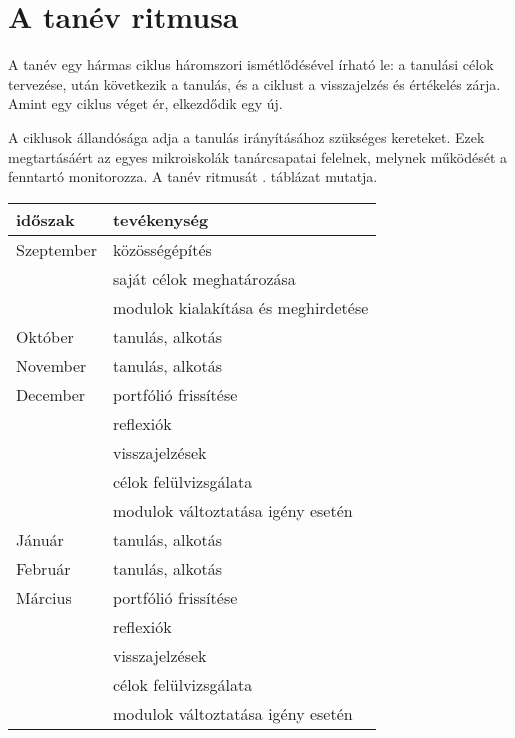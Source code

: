 \section{A tanév ritmusa}

A tanév egy hármas ciklus háromszori ismétlődésével írható le: a tanulási célok
tervezése, után következik a tanulás, és a ciklust a visszajelzés és értékelés
zárja.	Amint egy ciklus véget ér, elkezdődik egy új.

A ciklusok állandósága adja a tanulás irányításához szükséges kereteket. Ezek
megtartásáért az egyes mikroiskolák tanárcsapatai felelnek, melynek működését a
fenntartó monitorozza. A tanév ritmusát . táblázat
mutatja.

\begin{table}
  \centering
  \begin{tabular}{ l|l }
    \textbf{időszak} & \textbf{tevékenység}                \\
    \hline
    Szeptember       &
    közösségépítés                                         \\
                     & saját célok meghatározása           \\
                     & modulok kialakítása és meghirdetése
    \\ \hline

    Október          &
    tanulás, alkotás
    \\ \hline

    November         &
    tanulás, alkotás
    \\ \hline

    December         &
    portfólió frissítése                                   \\
                     & reflexiók                           \\
                     & visszajelzések                      \\
                     & célok felülvizsgálata               \\
                     & modulok változtatása igény esetén
    \\ \hline

    Jánuár           &
    tanulás, alkotás
    \\ \hline

    Február          &
    tanulás, alkotás
    \\ \hline

    Március          &
    portfólió frissítése                                   \\
                     & reflexiók                           \\
                     & visszajelzések                      \\
                     & célok felülvizsgálata               \\
                     & modulok változtatása igény esetén
    \\ \hline


\end{tabular}
\end{table}
